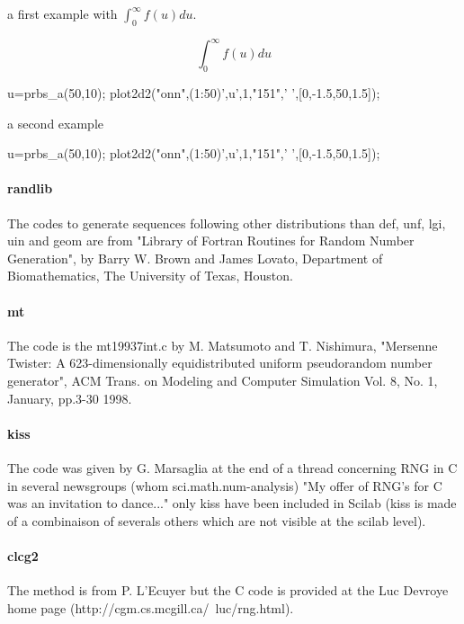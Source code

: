 \begin{examples}

a first example with $\int_0^\infty f(u)du$.

\[
\int_0^\infty f(u)du
\]

  \begin{program}
u=prbs_a(50,10);
plot2d2("onn",(1:50)',u',1,"151",' ',[0,-1.5,50,1.5]);
  \end{program}

\noindent a second example 

  \begin{program}
u=prbs_a(50,10);
plot2d2("onn",(1:50)',u',1,"151",' ',[0,-1.5,50,1.5]);
  \end{program}
\end{examples}

\begin{manseealso}
\end{manseealso}

\begin{authors}
  \paragraph{randlib} 
  The codes to generate sequences following other distributions than def, unf, lgi,  uin and geom are
  from "Library of Fortran Routines for Random Number  Generation", by Barry W. Brown 
  and James Lovato, Department of Biomathematics, The University of Texas, Houston.  
  \paragraph{mt} 
  The code is the mt19937int.c by M. Matsumoto and  T. Nishimura, "Mersenne Twister: 
  A 623-dimensionally equidistributed  uniform pseudorandom number generator", 
  ACM Trans. on Modeling and  Computer Simulation Vol. 8, No. 1, January, pp.3-30 1998.
  \paragraph{kiss} 
  The code was given by G. Marsaglia at the end of a thread concerning RNG in C in several 
  newsgroups (whom sci.math.num-analysis) "My offer of  RNG's for C was an invitation 
  to dance..." only kiss have been included in Scilab (kiss is made of a combinaison of 
  severals others which are not visible at the scilab level).
  \paragraph{clcg2} 
  The method is from P. L'Ecuyer but the C code is provided at the Luc  Devroye home page 
  (http://cgm.cs.mcgill.ca/~luc/rng.html).
\end{authors}
